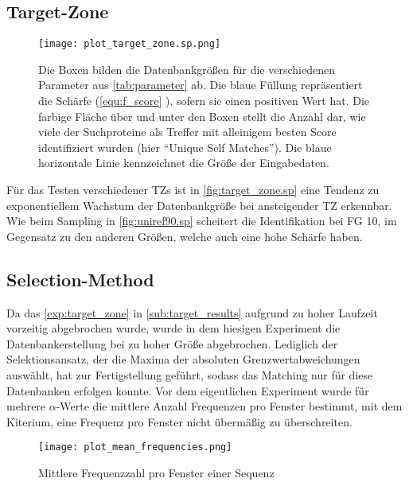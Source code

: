     \subsection{Target-Zone} %
        \label{sub:target_results}
        \begin{figure}[H]
            \centering
            \texttt{[image: plot\_target\_zone.sp.png]}
            \caption[Single-Protein-Matching ]{Die Boxen bilden die Datenbankgrößen für die verschiedenen Parameter aus \autoref{tab:parameter} ab. Die blaue Füllung repräsentiert die Schärfe (\autoref{equ:f_score} ), sofern sie einen positiven Wert hat. Die farbige Fläche über und unter den Boxen stellt die Anzahl dar, wie viele der Suchproteine als Treffer mit alleinigem besten Score identifiziert wurden (hier ``Unique Self Matches''). Die blaue horizontale Linie kennzeichnet die Größe der Eingabedaten.}
            \label{fig:target_zone.sp}
        \end{figure}

        Für das Testen verschiedener \aclp{TZ} ist in \autoref{fig:target_zone.sp} eine Tendenz zu exponentiellem Wachstum der Datenbankgröße bei ansteigender \ac{TZ} erkennbar. Wie beim Sampling in \autoref{fig:uniref90.sp} scheitert die Identifikation bei \ac{FG} 10, im Gegensatz zu den anderen Größen, welche auch eine hohe Schärfe haben.

    \subsection{Selection-Method} %
        \label{sub:selection_results}
        Da das \autoref{exp:target_zone} in \autoref{sub:target_results} aufgrund zu hoher Laufzeit vorzeitig abgebrochen wurde, wurde in dem hiesigen Experiment die Datenbankerstellung bei zu hoher Größe abgebrochen. Lediglich der Selektionsansatz, der die Maxima der absoluten Grenzwertabweichungen auswählt, hat zur Fertigstellung geführt, sodass das Matching nur für diese Datenbanken erfolgen konnte. Vor dem eigentlichen Experiment wurde für mehrere $\alpha$-Werte die mittlere Anzahl Frequenzen pro Fenster bestimmt, mit dem Kiterium, eine Frequenz pro Fenster nicht übermäßig zu überschreiten.

        \begin{figure}[H]
             \texttt{[image: plot\_mean\_frequencies.png]}
             \caption{Mittlere Frequenzzahl pro Fenster einer Sequenz}
             \label{fig:mean_frequencies}
        \end{figure} 


